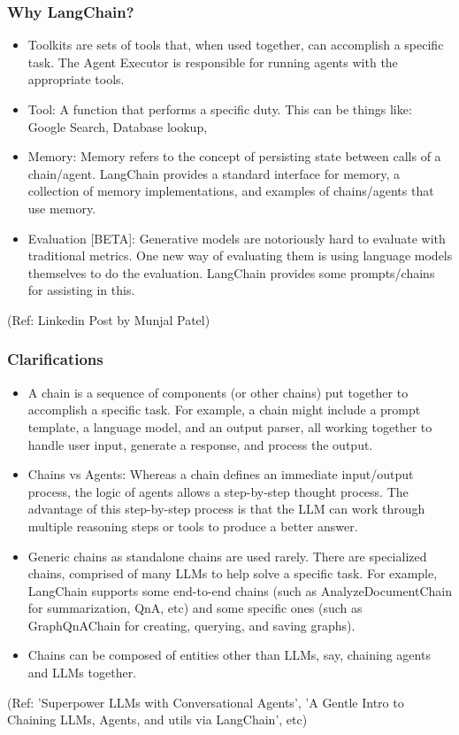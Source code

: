 \begin{frame}\frametitle{Why LangChain?}

\begin{itemize}
\item Toolkits are sets of tools that, when used together, can accomplish a specific task. The Agent Executor is responsible for running agents with the appropriate tools.
\item Tool: A function that performs a specific duty. This can be things like: Google Search, Database lookup,
\item Memory: Memory refers to the concept of persisting state between calls of a chain/agent. LangChain provides a standard interface for memory, a collection of memory implementations, and examples of chains/agents that use memory.
\item Evaluation [BETA]: Generative models are notoriously hard to evaluate with traditional metrics. One new way of evaluating them is using language models themselves to do the evaluation. LangChain provides some prompts/chains for assisting in this.
\end{itemize}

{\tiny (Ref: Linkedin Post by Munjal Patel)}
\end{frame}


\begin{frame}[fragile]\frametitle{Clarifications}

\begin{itemize}
\item A chain is a sequence of components (or other chains) put together to accomplish a specific task. For example, a chain might include a prompt template, a language model, and an output parser, all working together to handle user input, generate a response, and process the output.
\item Chains vs Agents: Whereas a chain defines an immediate input/output process, the logic of agents allows a step-by-step thought process. The advantage of this step-by-step process is that the LLM can work through multiple reasoning steps or tools to produce a better answer.
\item Generic chains as standalone chains are used rarely. There are specialized chains, comprised of many LLMs to help solve a specific task. For example, LangChain supports some end-to-end chains (such as AnalyzeDocumentChain for summarization, QnA, etc) and some specific ones (such as GraphQnAChain for creating, querying, and saving graphs). 
\item Chains can be composed of entities other than LLMs, say, chaining agents and LLMs together.
\end{itemize}

{\tiny (Ref: 'Superpower LLMs with Conversational Agents', 'A Gentle Intro to Chaining LLMs, Agents, and utils via LangChain', etc)}
\end{frame}

